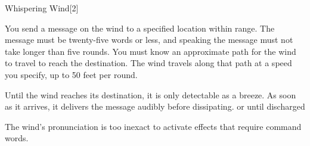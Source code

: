 \begin{spellsection}{Whispering Wind}[2]
    \begin{spellheader}
    \end{spellheader}
    \begin{spellcontent}
        \begin{spelltargetinginfo}
        \end{spelltargetinginfo}
        \begin{spelleffects}
            \spelleffect You send a message on the wind to a specified location within range. The message must be twenty-five words or less, and speaking the message must not take longer than five rounds. You must know an approximate path for the wind to travel to reach the destination. The wind travels along that path at a speed you specify, up to 50 feet per round.

            Until the wind reaches its destination, it is only detectable as a breeze. As soon as it arrives, it delivers the message audibly before dissipating.
            \spelldur \durext or until discharged
        \end{spelleffects}
    \end{spellcontent}
    \begin{spellfooter}
        \spellnotes The wind's pronunciation is too inexact to activate effects that require command words.
    \end{spellfooter}
\end{spellsection}

